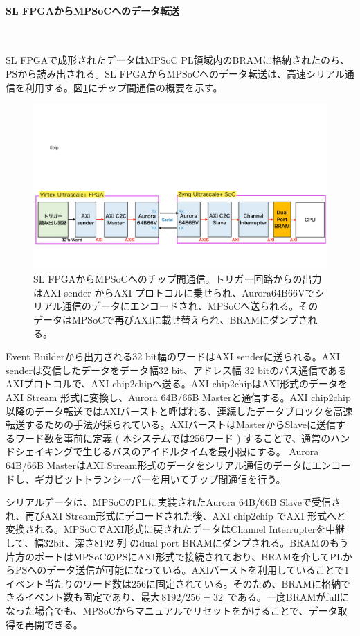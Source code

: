 \paragraph{SL FPGAからMPSoCへのデータ転送}　　
\par
SL FPGAで成形されたデータはMPSoC PL領域内のBRAMに格納されたのち、PSから読み出される。SL FPGAからMPSoCへのデータ転送は、高速シリアル通信を利用する。図\ref{C2C}にチップ間通信の概要を示す。
\begin{figure} 
\centering
\includegraphics[width=16cm]{fig/Test/C2C.pdf}
\caption[SL FPGAからMPSoCへのチップ間通信]{SL FPGAからMPSoCへのチップ間通信。トリガー回路からの出力はAXI sender からAXI プロトコルに乗せられ、Aurora64B66Vでシリアル通信のデータにエンコードされ、MPSoCへ送られる。そのデータはMPSoCで再びAXIに載せ替えられ、BRAMにダンプされる。}
\label{C2C}
\end{figure}

Event Builderから出力される32 bit幅のワードはAXI senderに送られる。AXI senderは受信したデータをデータ幅32 bit、アドレス幅 32 bitのバス通信であるAXIプロトコルで、AXI chip2chipへ送る。AXI chip2chipはAXI形式のデータをAXI Stream 形式に変換し、Aurora 64B/66B Masterと通信する。AXI chip2chip以降のデータ転送ではAXIバーストと呼ばれる、連続したデータブロックを高速転送するための手法が採られている。AXIバーストはMasterからSlaveに送信するワード数を事前に定義 ( 本システムでは256ワード ) することで、通常のハンドシェイキングで生じるバスのアイドルタイムを最小限にする。
Aurora 64B/66B MasterはAXI Stream形式のデータをシリアル通信のデータにエンコードし、ギガビットトランシーバーを用いてチップ間通信を行う。

シリアルデータは、MPSoCのPLに実装されたAurora 64B/66B Slaveで受信され、再びAXI Stream形式にデコードされた後、AXI chip2chip でAXI 形式へと変換される。MPSoCでAXI形式に戻されたデータはChannel Interrupterを中継して、幅32bit、深さ8192 列 のdual port BRAMにダンプされる。BRAMのもう片方のポートはMPSoCのPSにAXI形式で接続されており、BRAMを介してPLからPSへのデータ送信が可能になっている。AXIバーストを利用していることで1イベント当たりのワード数は256に固定されている。そのため、BRAMに格納できるイベント数も固定であり、最大$ \,8192 / 256 = 32\,$ である。一度BRAMがfullになった場合でも、MPSoCからマニュアルでリセットをかけることで、データ取得を再開できる。

